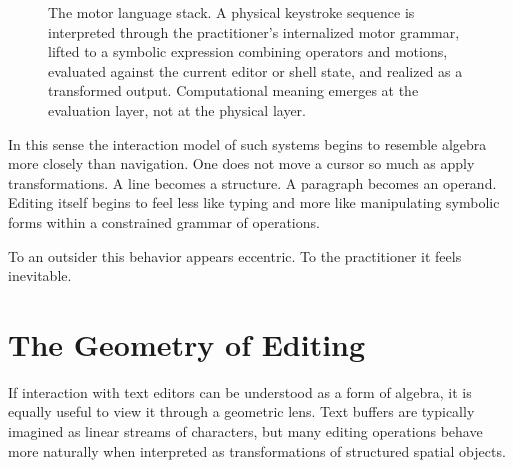 \documentclass[11pt]{article}
\theoremstyle{definition}
\begin{document}
\begin{figure}[h]
\centering
{}
\caption{The motor language stack. A physical keystroke sequence is
interpreted through the practitioner's internalized motor grammar,
lifted to a symbolic expression combining operators and motions, evaluated
against the current editor or shell state, and realized as a transformed
output. Computational meaning emerges at the evaluation layer, not at
the physical layer.}
\label{fig:motor_stack}
\end{figure}

In this sense the interaction model of such systems begins to resemble
algebra more closely than navigation. One does not move a cursor so
much as apply transformations. A line becomes a structure. A paragraph
becomes an operand. Editing itself begins to feel less like typing and
more like manipulating symbolic forms within a constrained grammar of
operations.

To an outsider this behavior appears eccentric. To the practitioner it
feels inevitable.

\section{The Geometry of Editing}

If interaction with text editors can be understood as a form of algebra,
it is equally useful to view it through a geometric lens. Text buffers
are typically imagined as linear streams of characters, but many editing
operations behave more naturally when interpreted as transformations of
structured spatial objects.
\end{document}
